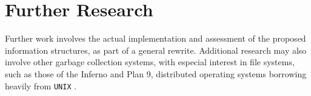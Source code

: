 \documentclass[a4paper]{article}
\begin{document}
\section{Further Research}
Further work involves the actual implementation and assessment of the proposed
information structures, as part of a general rewrite.
Additional research may also involve other garbage collection systems, with
especial interest in file systems, such as those of the Inferno and Plan 9,
distributed operating systems borrowing heavily from \texttt{UNIX}
\cite{dorward1997inferno} \cite{pike1995plan}.

\printbibliography{}
\end{document}
